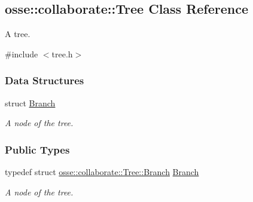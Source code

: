 \hypertarget{classosse_1_1collaborate_1_1_tree}{}\subsection{osse\+:\+:collaborate\+:\+:Tree Class Reference}
\label{classosse_1_1collaborate_1_1_tree}


A tree.  




{\ttfamily \#include $<$tree.\+h$>$}

\subsubsection*{Data Structures}
\begin{DoxyCompactItemize}
\item 
struct \hyperlink{structosse_1_1collaborate_1_1_tree_1_1_branch}{Branch}
\begin{DoxyCompactList}\small\item\em A node of the tree. \end{DoxyCompactList}\end{DoxyCompactItemize}
\subsubsection*{Public Types}
\begin{DoxyCompactItemize}
\item 
\mbox{\label{classosse_1_1collaborate_1_1_tree_a3481f1f1188d31e86f8a9b212c9a7ec7}} 
typedef struct \hyperlink{structosse_1_1collaborate_1_1_tree_1_1_branch}{osse\+::collaborate\+::\+Tree\+::\+Branch} \hyperlink{classosse_1_1collaborate_1_1_tree_a3481f1f1188d31e86f8a9b212c9a7ec7}{Branch}
\begin{DoxyCompactList}\small\item\em A node of the tree. \end{DoxyCompactList}\end{DoxyCompactItemize}
